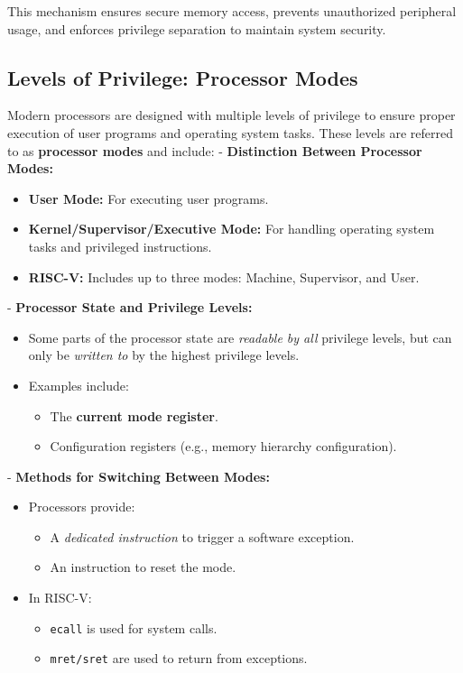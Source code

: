 \noindent This mechanism ensures secure memory access, prevents unauthorized peripheral usage, and enforces privilege separation to maintain system security.

\subsection{Levels of Privilege: Processor Modes}
Modern processors are designed with multiple levels of privilege to ensure proper execution of user programs and operating system tasks. These levels are referred to as \textbf{processor modes} and include:
\vspace{5px}
- \textbf{Distinction Between Processor Modes:} \\
\begin{itemize}
    \item \textbf{User Mode:} For executing user programs.
    \item \textbf{Kernel/Supervisor/Executive Mode:} For handling operating system tasks and privileged instructions.
    \item \textbf{RISC-V:} Includes up to three modes: Machine, Supervisor, and User.
\end{itemize}
\vspace{5px}
- \textbf{Processor State and Privilege Levels:} \\
\begin{itemize}
    \item Some parts of the processor state are \textit{readable by all} privilege levels, but can only be \textit{written to} by the highest privilege levels.
    \item Examples include:
    \begin{itemize}
        \item The \textbf{current mode register}.
        \item Configuration registers (e.g., memory hierarchy configuration).
    \end{itemize}
\end{itemize}
\vspace{5px}
- \textbf{Methods for Switching Between Modes:} \\
\begin{itemize}
    \item Processors provide:
    \begin{itemize}
        \item A \textit{dedicated instruction} to trigger a software exception.
        \item An instruction to reset the mode.
    \end{itemize}
    \item In RISC-V:
    \begin{itemize}
        \item \texttt{ecall} is used for system calls.
        \item \texttt{mret/sret} are used to return from exceptions.
    \end{itemize}
\end{itemize}

